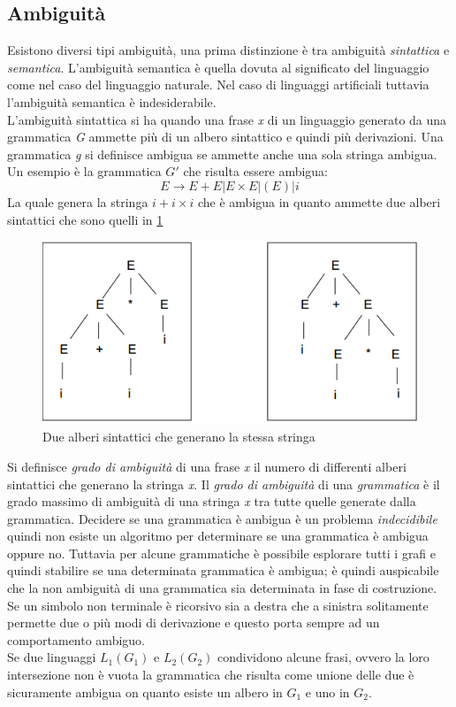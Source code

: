 \subsection{Ambiguità}
Esistono diversi tipi ambiguità, una prima distinzione è tra ambiguità \emph{sintattica} e \emph{semantica}. L'ambiguità semantica è quella dovuta al significato del linguaggio come nel caso del linguaggio naturale. Nel caso di linguaggi artificiali tuttavia l'ambiguità semantica è indesiderabile.\\
L'ambiguità sintattica si ha quando  una frase \emph{x} di un linguaggio generato da una grammatica \emph{G} ammette più di un albero sintattico e quindi più derivazioni. Una grammatica \emph{g} si definisce ambigua se ammette anche una sola stringa ambigua.
Un esempio è la grammatica $ G' $ che risulta essere ambigua:
$$E \rightarrow E + E | E\times E| (E)| i$$
La quale genera la stringa $ i+i\times i $ che è ambigua in quanto ammette due alberi sintattici che sono quelli in \figurename \ref{fig:g1tree}
\begin{figure}
\centering
\includegraphics[width=0.5\linewidth]{img/g1tree.png}
\caption{Due alberi sintattici che generano la stessa stringa}\label{fig:g1tree}
\end{figure}
Si definisce \emph{grado di ambiguità} di una frase \emph{x} il numero di differenti alberi sintattici che generano la stringa \emph{x}. Il \emph{grado di ambiguità} di una \emph{grammatica} è il grado massimo di ambiguità di una stringa \emph{x} tra tutte quelle generate dalla grammatica.
Decidere se una grammatica è ambigua è un problema \emph{indecidibile} quindi non esiste un algoritmo per determinare se una grammatica è ambigua oppure no. Tuttavia per alcune grammatiche è possibile esplorare tutti i grafi e quindi stabilire se una determinata grammatica è ambigua; è quindi  auspicabile che la non ambiguità di una grammatica sia determinata in fase di costruzione.\\
Se un simbolo non terminale è ricorsivo sia a destra che a sinistra solitamente permette due o più modi di derivazione e questo porta sempre ad un comportamento ambiguo.\\
Se due linguaggi $ L_1(G_1) $ e $ L_2(G_2) $ condividono alcune frasi, ovvero la loro intersezione non è vuota la grammatica che risulta come unione delle due è sicuramente ambigua on quanto esiste un albero in $ G_1 $ e uno in $ G_2 $.\\
